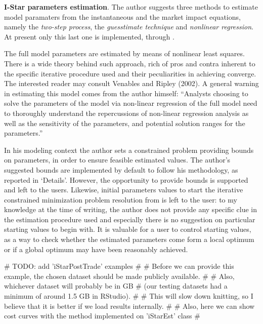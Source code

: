 \textbf{I-Star parameters estimation}. The author suggests three methods
to estimate model paramaters from the instantaneous and the market
impact equations, namely the \emph{two-step process}, the
\emph{guesstimate technique} and \emph{nonlinear regression}. At present
only this last one is implemented, through .

The full model parameters are estimated by means of nonlinear least
squares. There is a wide theory behind such approach, rich of pros and
contra inherent to the specific iterative procedure used and their
peculiarities in achieving converge. The interested reader may consult
Venables and Ripley (2002). A general warning in estimating this model
comes from the author himself: ``Analysts choosing to solve the
parameters of the model via non-linear regression of the full model need
to thoroughly understand the repercussions of non-linear regression
analysis as well as the sensitivity of the parameters, and potential
solution ranges for the parameters.''

In his modeling context the author sets a constrained problem providing
bounds on parameters, in order to ensure feasible estimated values. The
author's suggested bounds are implemented by default to follow his
methodology, as reported in `Details'. However, the opportunity to
provide bounds is supported and left to the users. Likewise, initial
parameters values to start the iterative constrained minimization
problem resolution from is left to the user: to my knowledge at the time
of writing, the author does not provide any specific clue in the
estimation procedure used and especially there is no suggestion on
particular starting values to begin with. It is valuable for a user to
control starting values, as a way to check whether the estimated
parameters come form a local optimum or if a global optimum may have
been reasonably achieved.

\begin{Schunk}
\begin{Sinput}
# TODO: add 'iStarPostTrade' examples
# 
# Before we can provide this example, the chosen dataset should be made publicly available.
# 
# Also, whichever dataset will probably be in GB 
# (our testing datasets had a minimum of around 1.5 GB in RStudio). 
# 
# This will slow down knitting, so I believe that it is better if we load results internally.
#  
# Also, here we can show cost curves with the method implemented on 'iStarEst' class
#
\end{Sinput}
\end{Schunk}

